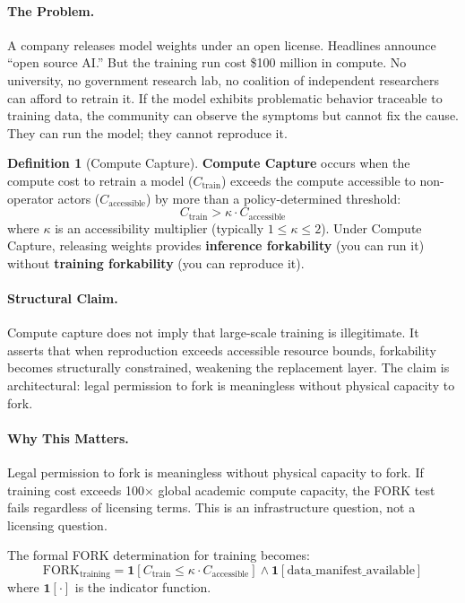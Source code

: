 \documentclass[11pt,a4paper]{article}
\theoremstyle{definition}
\newtheorem{definition}{Definition}[section]
\begin{document}
\paragraph{The Problem.} A company releases model weights under an open license. Headlines announce ``open source AI.'' But the training run cost \$100 million in compute. No university, no government research lab, no coalition of independent researchers can afford to retrain it. If the model exhibits problematic behavior traceable to training data, the community can observe the symptoms but cannot fix the cause. They can run the model; they cannot reproduce it.

\begin{definition}[Compute Capture]
\label{def:compute-capture}
\textbf{Compute Capture} occurs when the compute cost to retrain a model ($C_{\text{train}}$) exceeds the compute accessible to non-operator actors ($C_{\text{accessible}}$) by more than a policy-determined threshold:
\begin{equation}
C_{\text{train}} > \kappa \cdot C_{\text{accessible}}
\label{eq:compute-capture}
\end{equation}
where $\kappa$ is an accessibility multiplier (typically $1 \leq \kappa \leq 2$). Under Compute Capture, releasing weights provides \textbf{inference forkability} (you can run it) without \textbf{training forkability} (you can reproduce it).
\end{definition}

\paragraph{Structural Claim.} Compute capture does not imply that large-scale training is illegitimate. It asserts that when reproduction exceeds accessible resource bounds, forkability becomes structurally constrained, weakening the replacement layer. The claim is architectural: legal permission to fork is meaningless without physical capacity to fork.

\paragraph{Why This Matters.} Legal permission to fork is meaningless without physical capacity to fork. If training cost exceeds 100$\times$ global academic compute capacity, the FORK test fails regardless of licensing terms. This is an infrastructure question, not a licensing question.

The formal FORK determination for training becomes:
\begin{equation}
\text{FORK}_{\text{training}} = \mathbf{1}[C_{\text{train}} \leq \kappa \cdot C_{\text{accessible}}] \land \mathbf{1}[\text{data\_manifest\_available}]
\label{eq:fork-training}
\end{equation}
where $\mathbf{1}[\cdot]$ is the indicator function.
\end{document}
